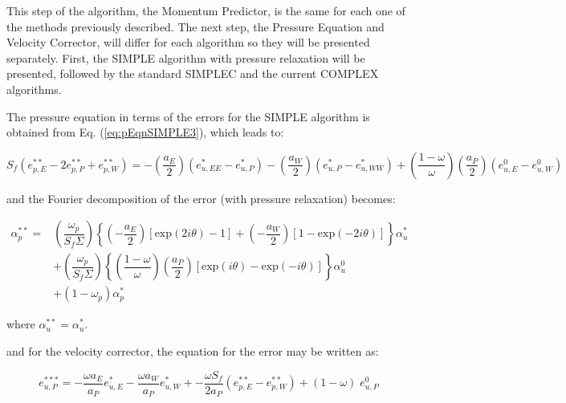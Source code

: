 \documentclass[final,3p,times,11pt,onecolumn]{myElsarticle}
\numberwithin{equation}{section}
\begin{document}
This step of the algorithm, the Momentum Predictor, is the same for each one of the methods previously described. The next step, the Pressure Equation and Velocity Corrector, will differ for each algorithm so they will be presented separately. First, the SIMPLE algorithm with pressure relaxation will be presented, followed by the standard SIMPLEC and the current COMPLEX algorithms.

The pressure equation in terms of the errors for the SIMPLE algorithm is obtained from Eq. (\ref{eq:pEqnSIMPLE3}), which leads to:

\begin{equation}
    S_f (e_{p,E}^{**} - 2 e_{p,P}^{**} + e_{p,W}^{**}) = 
     -\left(\dfrac{a_E}{2}\right) (e_{u,EE}^* - e_{u,P}^*) 
    -\left(\dfrac{a_W}{2}\right) (e_{u,P}^* - e_{u,WW}^*)  +
    \left( \dfrac{1-\omega}{\omega} \right) \left(\dfrac{a_P}{2}\right) (e_{u,E}^0 - e_{u,W}^0)
\end{equation}

\noindent and the Fourier decomposition of the error (with pressure relaxation) becomes:

\begin{equation}
\begin{split}
    \alpha_p^{**} = &\left( \dfrac{\omega_p}{S_f \Sigma} \right) 
                    \left\{ \left(-\dfrac{a_E}{2} \right) \left[\text{exp} (2 i \theta) - 1 \right] +
                            \left(-\dfrac{a_W}{2} \right) \left[1 - \text{exp} (-2 i \theta)\right]
                    \right\} \alpha_u^{*} \\
                    & + \left( \dfrac{\omega_p}{S_f \Sigma} \right) 
                    \left\{ \left(\dfrac{1-\omega}{\omega} \right) \left(\dfrac{a_P}{2} \right) \left[\text{exp} (i \theta) - \text{exp} (- i \theta) \right] 
                    \right\} \alpha_u^{0} \\
                    & + (1-\omega_p) \alpha_p^*    
\end{split}
\end{equation}

\noindent where $\alpha_u^{**} = \alpha_u^{*}$.

\noindent and for the velocity corrector, the equation for the error may be written as:

\begin{equation}
    e_{u,P}^{***} = -\dfrac{\omega a_E}{a_P} e_{u,E}^{*} -\dfrac{\omega a_W}{a_P} e_{u,W}^{*} +
                   -\dfrac{\omega S_f}{2 a_P} (e_{p,E}^{**}-e_{p,W}^{**}) +
                   (1-\omega) \; e_{u,P}^0
\end{equation}
\end{document}
